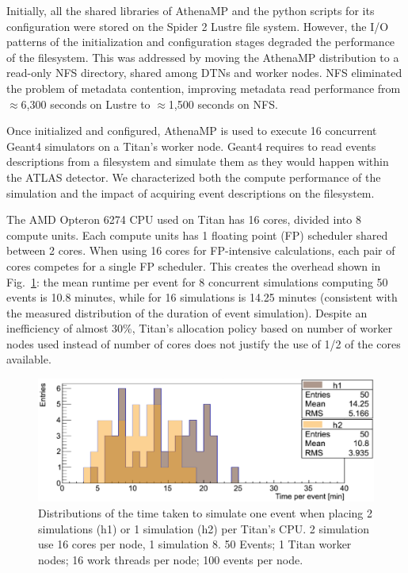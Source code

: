 \documentclass[conference]{IEEEtran}
\begin{document}
Initially, all the shared libraries of AthenaMP and the python scripts for its
configuration were stored on the Spider 2 Lustre file system. However, the I/O
patterns of the initialization and configuration stages degraded the performance
of the filesystem. This was addressed by moving the AthenaMP distribution to a
read-only NFS directory, shared among DTNs and worker nodes. NFS eliminated the
problem of metadata contention, improving metadata read performance from
$\approx$6,300 seconds on Lustre to $\approx$1,500 seconds on NFS.

Once initialized and configured, AthenaMP is used to execute 16 concurrent
Geant4 simulators on a Titan's worker node. Geant4 requires to read events
descriptions from a filesystem and simulate them as they would happen within the
ATLAS detector. We characterized both the compute performance of the simulation
and the impact of acquiring event descriptions on the filesystem.

The AMD Opteron 6274 CPU used on Titan has 16 cores, divided into 8 compute
units. Each compute units has 1 floating point (FP) scheduler shared between 2
cores. When using 16 cores for FP-intensive calculations, each pair of cores
competes for a single FP scheduler. This creates the overhead shown in
Fig.~\ref{fig:comparison-8-16cores}: the mean runtime per event for 8
concurrent simulations computing 50 events is 10.8 minutes, while for 16
simulations is 14.25 minutes (consistent with the measured distribution of the
duration of event simulation). Despite an inefficiency of almost 30\%, Titan's
allocation policy based on number of worker nodes used instead of number of
cores does not justify the use of 1/2 of the cores available.

\begin{figure}[htp]
    \includegraphics[clip,width=\columnwidth]{tx8_tx16_comparison_vsquashed.pdf}
    \caption{Distributions of the time taken to simulate one event when placing
    2 simulations (h1) or 1 simulation (h2) per Titan's CPU. 2 simulation use 16
    cores per node, 1 simulation 8. 50 Events; 1 Titan worker nodes; 16 work
    threads per node; 100 events per node.}
\label{fig:comparison-8-16cores}
\end{figure}
\end{document}
